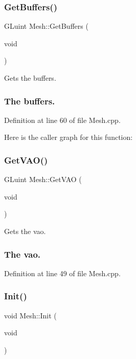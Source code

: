 \subsubsection{\texorpdfstring{Get\+Buffers()}{GetBuffers()}}
{\footnotesize\ttfamily G\+Luint Mesh\+::\+Get\+Buffers (\begin{DoxyParamCaption}\item[{void}]{ }\end{DoxyParamCaption})}



Gets the buffers. 





\subsubsection*{The buffers.  }

Definition at line 60 of file Mesh.\+cpp.

Here is the caller graph for this function\+:
\mbox{\label{class_mesh_a861cdeee95f6bbaf8d68392210a63e8b}} 
\subsubsection{\texorpdfstring{Get\+V\+A\+O()}{GetVAO()}}
{\footnotesize\ttfamily G\+Luint Mesh\+::\+Get\+V\+AO (\begin{DoxyParamCaption}\item[{void}]{ }\end{DoxyParamCaption})}



Gets the vao. 





\subsubsection*{The vao.  }

Definition at line 49 of file Mesh.\+cpp.

\mbox{\label{class_mesh_a02a9821c2034f01baf2a532d2488cde9}} 
\subsubsection{\texorpdfstring{Init()}{Init()}}
{\footnotesize\ttfamily void Mesh\+::\+Init (\begin{DoxyParamCaption}\item[{void}]{ }\end{DoxyParamCaption})}



